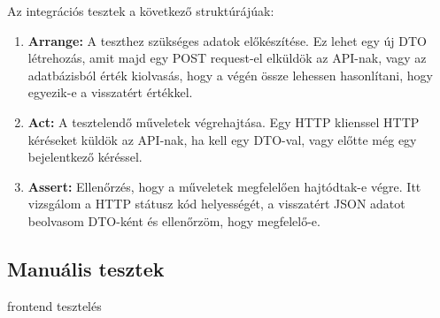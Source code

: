 Az integrációs tesztek a következő struktúrájúak:
\begin{enumerate}
	\item \textbf{Arrange:} A teszthez szükséges adatok előkészítése. Ez lehet egy új DTO létrehozás, amit majd egy POST request-el elküldök az API-nak, vagy az adatbázisból érték kiolvasás, hogy a végén össze lehessen hasonlítani, hogy egyezik-e a visszatért értékkel.
	\item \textbf{Act:} A tesztelendő műveletek végrehajtása. Egy HTTP klienssel HTTP kéréseket küldök az API-nak, ha kell egy DTO-val, vagy előtte még egy bejelentkező kéréssel.
	\item \textbf{Assert:} Ellenőrzés, hogy a műveletek megfelelően hajtódtak-e végre. Itt vizsgálom a HTTP státusz kód helyességét, a visszatért JSON adatot beolvasom DTO-ként és ellenőrzöm, hogy megfelelő-e.
\end{enumerate}

\subsection{Manuális tesztek}
frontend tesztelés





























